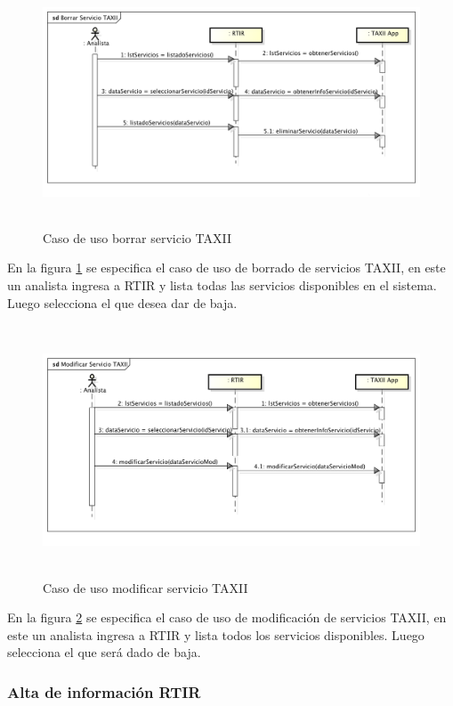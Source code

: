 \bigskip
\begin{figure}[ht!]
	\centering
	\includegraphics[width=5.7634in,height=2.898in]{Analisis22-img/Analisis22-img024.png} 
	\caption{Caso de uso borrar	servicio TAXII}
	\label{fig.borradoserviciotaxii}
\end{figure}
{
	En la figura \ref{fig.borradoserviciotaxii} se especifica el caso de uso de borrado de servicios TAXII, en este un analista ingresa a RTIR y lista
	todas las servicios disponibles en el sistema. Luego selecciona el que desea dar de baja.}
\newpage
\begin{figure}
	\centering
	\includegraphics[width=5.7638in,height=2.9366in]{Analisis22-img/Analisis22-img025.png} 
	\caption{Caso de uso modificar servicio TAXII}
	\label{fig.modificarserviciotaxii}
\end{figure}

{
	En la figura \ref{fig.modificarserviciotaxii} se especifica el caso de uso de modificación de servicios TAXII, en este un analista ingresa a RTIR y
	lista todos los servicios disponibles. Luego selecciona el que será dado de baja.}
\newpage
\subsubsection{Alta de información RTIR}

